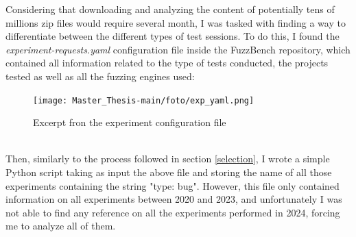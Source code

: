 \newpage
Considering that downloading and analyzing the content of potentially tens of millions zip files would require several month, I was tasked with finding a way to differentiate between the different types of test sessions.
\newline \newline
To do this, I found the \textit{experiment-requests.yaml} configuration file \cite{exp_yaml} inside the FuzzBench repository, which contained
all information related to the type of tests conducted, the projects tested as well as all the fuzzing engines used:
\newline
\begin{figure}[h]
\centering
\texttt{[image: Master\_Thesis-main/foto/exp\_yaml.png]}
\caption{Excerpt fron the experiment configuration file}
\label{fig:exp_yaml}
\end{figure}
\ \\
Then, similarly to the process followed in section \ref{selection}, I wrote a simple Python script taking as input the above file and storing the name of all those experiments containing the string "type: bug".
\newline \newline
However, this file only contained information on all experiments between 2020 and 2023, and unfortunately I was not able to find any reference on all the experiments performed in 2024, forcing me to analyze all of them.



